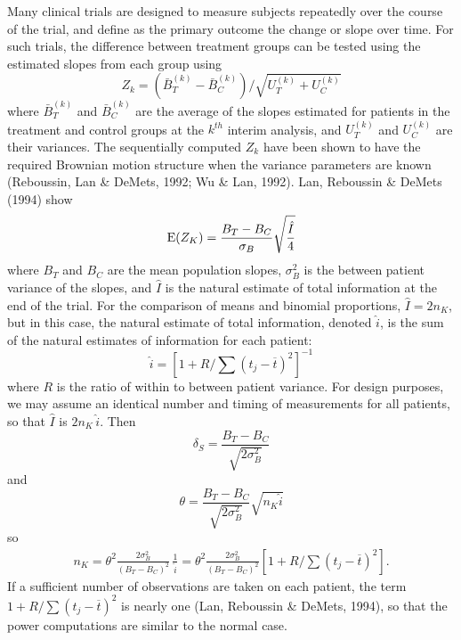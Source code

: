 Many clinical trials are designed to measure subjects repeatedly over the
course of the trial, and define as the primary outcome the change or slope
over time.  For such trials, the difference between treatment groups can
be tested using the estimated slopes from each group using
\begin{displaymath}
  Z_k = (\bar B_T^{(k)} - \bar B_C^{(k)}) /  \sqrt{U_T^{(k)} + U_C^{(k)}}
\end{displaymath}
where $\bar B_T^{(k)}$ and $\bar B_C^{(k)}$ are the average of the slopes
estimated for patients in the treatment and control groups at the $k^{th}$
interim analysis, and $U_T^{(k)}$ and $U_C^{(k)}$ are their variances.
The sequentially computed $Z_k$ have been shown to have the required
Brownian motion structure when the variance parameters are known
(Reboussin, Lan \& DeMets, 1992; Wu \& Lan, 1992).  Lan, Reboussin \&
DeMets (1994) show
\begin{displaymath}
  {\rm E} (Z_K) =
       \frac{B_T - B_C}{\sigma_B} \sqrt{\frac{\hat I}{4}}
\end{displaymath}
where $B_T$ and $B_C$ are the mean population slopes, $\sigma^2_B$ is the
between patient variance of the slopes, and $\hat I$ is the natural
estimate of total information at the end of the trial.  For the comparison
of means and binomial proportions, $\hat I = 2 n_K$, but in this case, the
natural estimate of total information, denoted $\hat i$, is the sum of the
natural estimates of information for each patient:
\begin{displaymath}
  \hat i =
      \left[1+ R/\sum (t_j - \overline t)^2 \right]^{-1}
\end{displaymath}
where $R$ is the ratio of within to between patient variance.  For design
purposes, we may assume an identical number and timing of measurements for
all patients, so that $\hat I$ is $2 n_K \, \hat i$.  Then
\begin{displaymath}
  \delta_S = \frac{B_T - B_C}{\sqrt{2 \sigma_B^2}}
\end{displaymath}
and
\begin{displaymath}
  \theta = \frac{B_T - B_C}{\sqrt{2 \sigma_B^2}} \sqrt{n_K \hat i}
\end{displaymath}
so
\begin{eqnarray*}
  n_K = \theta^2 \frac{2 \sigma_B^2}{(B_T - B_C)^2} \, \frac{1}{\hat i}
      = \theta^2 \frac{2 \sigma_B^2}{(B_T - B_C)^2}
      \left[1+ R/\sum (t_j - \overline t)^2 \right].
\end{eqnarray*}
If a sufficient number of observations are taken on each patient, the term
$1+ R/\sum (t_j - \overline t)^2$ is nearly one (Lan, Reboussin
\& DeMets, 1994), so that the power computations are similar to the normal
case.


